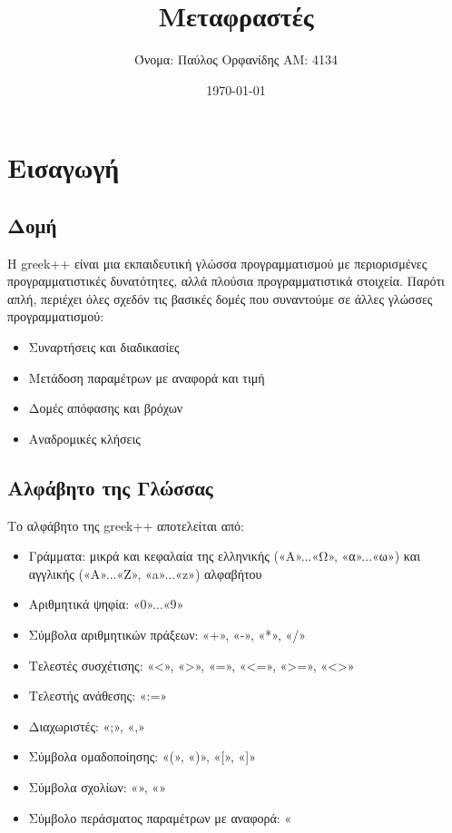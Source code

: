 \documentclass[12pt,a4paper]{article}
\title{\textbf{Μεταφραστές}}
\author{Όνομα: Παύλος Ορφανίδης ΑΜ: 4134}
\date{\today}
\begin{document}
\maketitle


\tableofcontents
\newpage


\section{Εισαγωγή}\label{sec:intro}
    \subsection{Δομή}
        Η greek++ είναι μια εκπαιδευτική γλώσσα προγραμματισμού με περιορισμένες προγραμματιστικές δυνατότητες, αλλά πλούσια προγραμματιστικά στοιχεία.
        Παρότι απλή, περιέχει όλες σχεδόν τις βασικές δομές που συναντούμε σε άλλες γλώσσες προγραμματισμού:
        \begin{itemize}
            \item Συναρτήσεις και διαδικασίες
            \item Μετάδοση παραμέτρων με αναφορά και τιμή
            \item Δομές απόφασης και βρόχων
            \item Αναδρομικές κλήσεις
        \end{itemize}

    \subsection{Αλφάβητο της Γλώσσας}
        Το αλφάβητο της greek++ αποτελείται από:
        \begin{itemize}
            \item Γράμματα: μικρά και κεφαλαία της ελληνικής («Α»...«Ω», «α»...«ω») και αγγλικής («Α»...«Ζ», «a»...«z») αλφαβήτου
            \item Αριθμητικά ψηφία: «0»...«9»
            \item Σύμβολα αριθμητικών πράξεων: «+», «-», «*», «/»
            \item Τελεστές συσχέτισης: «<», «>», «=», «<=», «>=», «<>»
            \item Τελεστής ανάθεσης: «:=»
            \item Διαχωριστές: «;», «,»
            \item Σύμβολα ομαδοποίησης: «(», «)», «[», «]»
            \item Σύμβολα σχολίων: «{», «}»
            \item Σύμβολο περάσματος παραμέτρων με αναφορά: «%
        \end{itemize}
\end{document}
